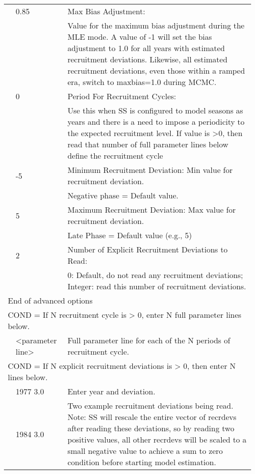 \begin{longtable}{p{1cm} p{3cm} p{11cm}}
	\Tstrut & 0.85 & Max Bias Adjustment: \\
			&      & Value for the maximum bias adjustment during the MLE mode. A value of -1 will set the bias adjustment to 1.0 for all years with estimated recruitment deviations. Likewise, all estimated recruitment deviations, even those within a ramped era, switch to maxbias=1.0 during MCMC.\\

	\Tstrut & 0    & Period For Recruitment Cycles: \\
			&      & Use this when SS is configured to model seasons as years and there is a need to impose a periodicity to the expected recruitment level.  If value is >0, then read that number of full parameter lines below define the recruitment cycle \\
	
	\Tstrut & -5   & Minimum Recruitment Deviation: Min value for recruitment deviation.\\
			&      & Negative phase = Default value.\\

	\Tstrut & 5    & Maximum Recruitment Deviation: Max value for recruitment deviation. \\
			&      & Late Phase = Default value (e.g., 5)\\
	
	\Tstrut & 2    & Number of Explicit Recruitment Deviations to Read:\\
			&      & 0: Default, do not read any recruitment deviations; Integer: read this number of recruitment deviations.\\
	
	\multicolumn{3}{l}{End of advanced options}\Tstrut\Bstrut\\
	\hline

	\multicolumn{3}{l}{COND = If N recruitment cycle is > 0, enter N full parameter lines below.}\Tstrut\\
	\Tstrut & <parameter line> & Full parameter line for each of the N periods of recruitment cycle.\Bstrut\\
	\hline

	\multicolumn{3}{l}{COND = If N explicit recruitment deviations is > 0, then enter N lines below.}\Tstrut\Bstrut\\
	& 1977 3.0 & Enter year and deviation.\\
	& 1984 3.0 & Two example recruitment deviations being read.  Note: SS will rescale the entire vector of recrdevs after reading these deviations, so by reading two positive values, all other recrdevs will be scaled to a small negative value to achieve a sum to zero condition before starting model estimation.\Bstrut\\
	\hline
\end{longtable}


